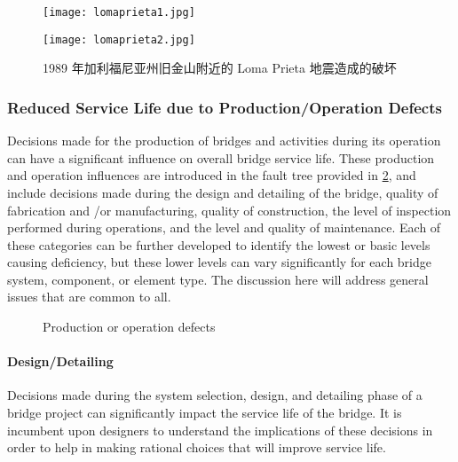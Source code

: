 \begin{figure}
  \begin{minipage}{0.55\linewidth}\centering
    \texttt{[image: lomaprieta1.jpg]}
  \end{minipage}%
  \begin{minipage}{0.45\linewidth}\centering
    \texttt{[image: lomaprieta2.jpg]}
  \end{minipage}
  \caption{1989 年加利福尼亚州旧金山附近的 Loma Prieta 地震造成的破坏}
  \label{fig:Loma-Prieta-earthquake-damage}
\end{figure}

\subsubsection{Reduced Service Life due to Production/Operation Defects}

Decisions made for the production of bridges and activities during its operation can have a significant influence
on overall bridge service life. These production and operation influences are introduced in the fault tree provided in
\cref{fig:production-operation-defects}, and include decisions made during the design and detailing of the bridge, quality of fabrication and /or
manufacturing, quality of construction, the level of inspection performed during operations, and the level and quality
of maintenance. Each of these categories can be further developed to identify the lowest or basic levels causing
deficiency, but these lower levels can vary significantly for each bridge system, component, or element type. The
discussion here will address general issues that are common to all.


\begin{figure}
  \caption{Production or operation defects}
  \label{fig:production-operation-defects}
\end{figure}

\paragraph{Design/Detailing}
Decisions made during the system selection, design, and detailing phase of a bridge project can significantly
impact the service life of the bridge. It is incumbent upon designers to understand the implications of these decisions
in order to help in making rational choices that will improve service life.

